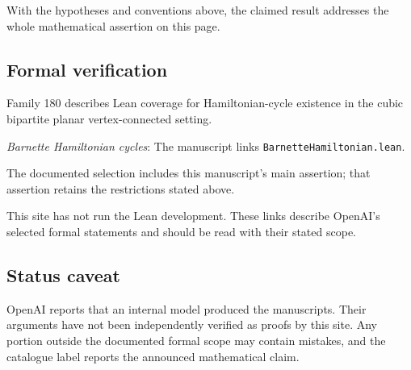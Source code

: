 \documentclass[11pt]{article}
\begin{document}
With the hypotheses and conventions above, the claimed result addresses the whole mathematical assertion on this page.

\subsection{Formal verification}
Family 180 describes Lean coverage for Hamiltonian-cycle existence in the cubic bipartite planar vertex-connected setting.

\textit{Barnette Hamiltonian cycles}: The manuscript links \texttt{BarnetteHamiltonian.lean}.

The documented selection includes this manuscript’s main assertion; that assertion retains the restrictions stated above.

This site has not run the Lean development. These links describe OpenAI’s selected formal statements and should be read with their stated scope.

\subsection{Status caveat}
OpenAI reports that an internal model produced the manuscripts. Their arguments have not been independently verified as proofs by this site. Any portion outside the documented formal scope may contain mistakes, and the catalogue label reports the announced mathematical claim.
\end{document}
